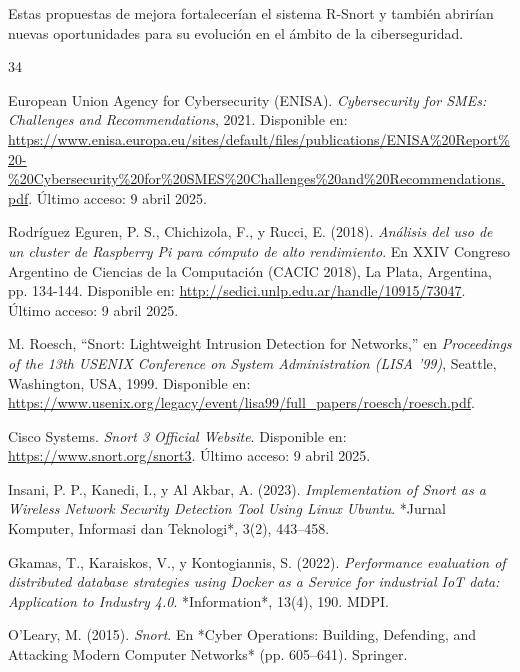 \documentclass[11pt,a4paper,twoside]{report}
\begin{document}
Estas propuestas de mejora fortalecerían el sistema R-Snort y también abrirían nuevas oportunidades para su evolución en el ámbito de la ciberseguridad.


\cleardoublepage
{}
{}

\begin{thebibliography}{34}
		
	European Union Agency for Cybersecurity (ENISA). \textit{Cybersecurity for SMEs: Challenges and Recommendations}, 2021. Disponible en: \url{https://www.enisa.europa.eu/sites/default/files/publications/ENISA%20Report%20-%20Cybersecurity%20for%20SMES%20Challenges%20and%20Recommendations.pdf}. Último acceso: 9 abril 2025.
	
	Rodríguez Eguren, P. S., Chichizola, F., y Rucci, E. (2018). \textit{Análisis del uso de un cluster de Raspberry Pi para cómputo de alto rendimiento}. En XXIV Congreso Argentino de Ciencias de la Computación (CACIC 2018), La Plata, Argentina, pp. 134-144. Disponible en: \url{http://sedici.unlp.edu.ar/handle/10915/73047}. Último acceso: 9 abril 2025.
	
	M. Roesch, ``Snort: Lightweight Intrusion Detection for Networks,'' en \textit{Proceedings of the 13th USENIX Conference on System Administration (LISA '99)}, Seattle, Washington, USA, 1999. Disponible en: \url{https://www.usenix.org/legacy/event/lisa99/full_papers/roesch/roesch.pdf}.
	
	Cisco Systems. \textit{Snort 3 Official Website}. Disponible en: \url{https://www.snort.org/snort3}. Último acceso: 9 abril 2025.
	
	Insani, P. P., Kanedi, I., y Al Akbar, A. (2023). \textit{Implementation of Snort as a Wireless Network Security Detection Tool Using Linux Ubuntu}. *Jurnal Komputer, Informasi dan Teknologi*, 3(2), 443--458.
	
	Gkamas, T., Karaiskos, V., y Kontogiannis, S. (2022). \textit{Performance evaluation of distributed database strategies using Docker as a Service for industrial IoT data: Application to Industry 4.0}. *Information*, 13(4), 190. MDPI.
	
	O'Leary, M. (2015). \textit{Snort}. En *Cyber Operations: Building, Defending, and Attacking Modern Computer Networks* (pp. 605--641). Springer.
	

\end{thebibliography}
\end{document}
